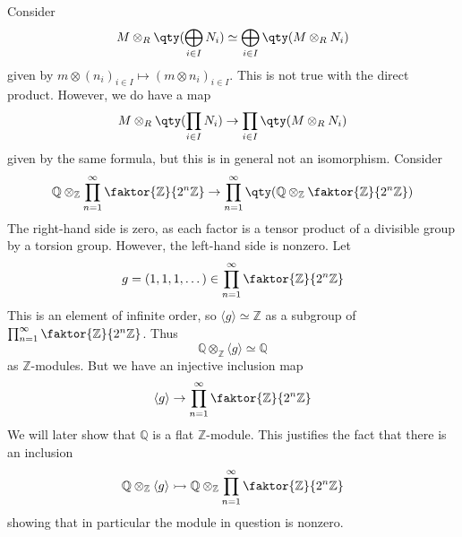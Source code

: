 \begin{example}
    Consider
    \[ M \otimes_R \qty(\bigoplus_{i \in I} N_i) \simeq \bigoplus_{i \in I} \qty(M \otimes_R N_i) \]
    given by \( m \otimes (n_i)_{i \in I} \mapsto (m \otimes n_i)_{i \in I} \).
    This is not true with the direct product.
    However, we do have a map
    \[ M \otimes_R \qty(\prod_{i \in I} N_i) \to \prod_{i \in I} \qty(M \otimes_R N_i) \]
    given by the same formula, but this is in general not an isomorphism.
    Consider
    \[ \mathbb Q \otimes_{\mathbb Z} \prod_{n = 1}^\infty \faktor{\mathbb Z}{2^n \mathbb Z} \to \prod_{n = 1}^\infty \qty(\mathbb Q \otimes_{\mathbb Z} \faktor{\mathbb Z}{2^n \mathbb Z}) \]
    The right-hand side is zero, as each factor is a tensor product of a divisible group by a torsion group.
    However, the left-hand side is nonzero.
    Let
    \[ g = (1, 1, 1, \dots) \in \prod_{n = 1}^\infty \faktor{\mathbb Z}{2^n \mathbb Z} \]
    This is an element of infinite order, so \( \langle g \rangle \simeq \mathbb Z \) as a subgroup of \( \prod_{n = 1}^\infty \faktor{\mathbb Z}{2^n \mathbb Z} \).
    Thus
    \[ \mathbb Q \otimes_{\mathbb Z} \langle g \rangle \simeq \mathbb Q \]
    as \( \mathbb Z \)-modules.
    But we have an injective inclusion map
    \[ \langle g \rangle \to \prod_{n = 1}^\infty \faktor{\mathbb Z}{2^n \mathbb Z} \]
    We will later show that \( \mathbb Q \) is a flat \( \mathbb Z \)-module.
    This justifies the fact that there is an inclusion
    \[ \mathbb Q \otimes_{\mathbb Z} \langle g \rangle \rightarrowtail \mathbb Q \otimes_{\mathbb Z} \prod_{n = 1}^\infty \faktor{\mathbb Z}{2^n \mathbb Z} \]
    showing that in particular the module in question is nonzero.
\end{example}
